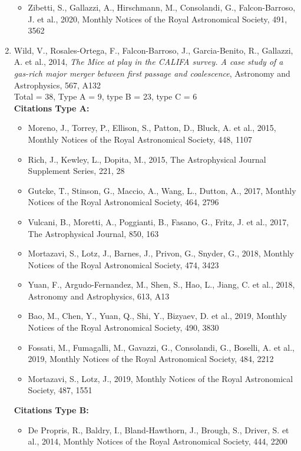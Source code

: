 \documentclass{letter}
\begin{document}
\begin{enumerate}
\begin{itemize}
\item Zibetti, S., Gallazzi, A., Hirschmann, M., Consolandi, G., Falcon-Barroso, J. et al., 2020, Monthly Notices of the Royal Astronomical Society, 491, 3562
\end{itemize}
\item Wild, V., Rosales-Ortega, F., Falcon-Barroso, J., Garcia-Benito, R., Gallazzi, A. et al., 2014, {\it The Mice at play in the CALIFA survey. A case study of a gas-rich major merger between first passage and coalescence}, Astronomy and Astrophysics, 567, A132 \\ 
Total = 38, Type A = 9, type B = 23, type C = 6 \\ 
{\bf Citations Type A:}
\begin{itemize}
\item Moreno, J., Torrey, P., Ellison, S., Patton, D., Bluck, A. et al., 2015, Monthly Notices of the Royal Astronomical Society, 448, 1107
\item Rich, J., Kewley, L., Dopita, M., 2015, The Astrophysical Journal Supplement Series, 221, 28
\item Gutcke, T., Stinson, G., Maccio, A., Wang, L., Dutton, A., 2017, Monthly Notices of the Royal Astronomical Society, 464, 2796
\item Vulcani, B., Moretti, A., Poggianti, B., Fasano, G., Fritz, J. et al., 2017, The Astrophysical Journal, 850, 163
\item Mortazavi, S., Lotz, J., Barnes, J., Privon, G., Snyder, G., 2018, Monthly Notices of the Royal Astronomical Society, 474, 3423
\item Yuan, F., Argudo-Fernandez, M., Shen, S., Hao, L., Jiang, C. et al., 2018, Astronomy and Astrophysics, 613, A13
\item Bao, M., Chen, Y., Yuan, Q., Shi, Y., Bizyaev, D. et al., 2019, Monthly Notices of the Royal Astronomical Society, 490, 3830
\item Fossati, M., Fumagalli, M., Gavazzi, G., Consolandi, G., Boselli, A. et al., 2019, Monthly Notices of the Royal Astronomical Society, 484, 2212
\item Mortazavi, S., Lotz, J., 2019, Monthly Notices of the Royal Astronomical Society, 487, 1551
\end{itemize}
{\bf Citations Type B:}
\begin{itemize}
\item De Propris, R., Baldry, I., Bland-Hawthorn, J., Brough, S., Driver, S. et al., 2014, Monthly Notices of the Royal Astronomical Society, 444, 2200

\end{itemize}
\end{enumerate}
\end{document}
